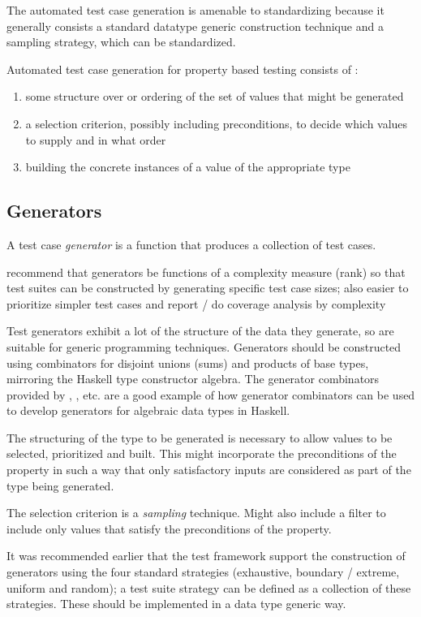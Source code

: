 The automated test case generation is amenable to standardizing
because it generally consists a standard datatype generic construction technique
and a sampling strategy, which can be standardized.

Automated test case generation for property based testing consists of :

\begin{enumerate}
\item some structure over or ordering of the set of values that might be generated
\item a selection criterion, possibly including preconditions, to decide which values to supply and in what order
\item building the concrete instances of a value of the appropriate type
\end{enumerate}

\subsection{Generators}

A test case \emph{generator} is a function that produces a collection of test cases.

recommend that generators be functions of a complexity measure (rank)
so that test suites can be constructed by generating specific test case sizes;
also easier to prioritize simpler test cases and report / do coverage analysis by complexity

Test generators exhibit a lot of the structure of the data they generate,
so are suitable for generic programming techniques.
Generators should be constructed using combinators for 
disjoint unions (sums) and products of base types,
mirroring the Haskell type constructor algebra.
The generator combinators provided by \QC, \SC, etc.
are a good example of how generator combinators can be used
to develop generators for algebraic data types in Haskell.

The structuring of the type to be generated is necessary to
allow values to be selected, prioritized and built.
This might incorporate the preconditions of the property in such a way
that only satisfactory inputs are considered as part of the type being generated.

The selection criterion is a \emph{sampling} technique.
Might also include a filter to include only values that satisfy the preconditions of the property.

It was recommended earlier that the test framework support
the construction of generators using the four standard strategies
(exhaustive, boundary / extreme, uniform and random);
a test suite strategy can be defined as a collection of these strategies.
These should be implemented in a data type generic way.

